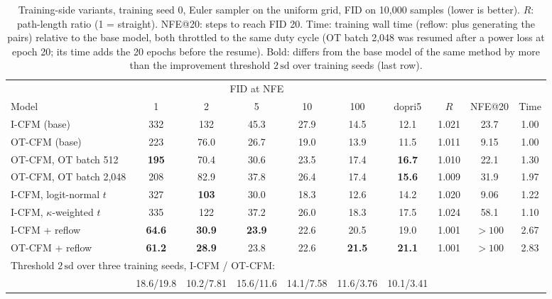 \begin{table}[t]
\centering
\caption{Training-side variants, training seed 0, Euler sampler on the uniform grid, FID on 10,000 samples (lower is better). $R$: path-length ratio (1 = straight). NFE@20: steps to reach FID 20. Time: training wall time (reflow: plus generating the pairs) relative to the base model, both throttled to the same duty cycle (OT batch 2,048 was resumed after a power loss at epoch 20; its time adds the 20 epochs before the resume). Bold: differs from the base model of the same method by more than the improvement threshold $2\,\mathrm{sd}$ over training seeds (last row).}
\label{tab:training}
\small
\setlength{\tabcolsep}{2.9pt}
\begin{tabular}{lccccccccc}
\toprule
 & \multicolumn{5}{c}{FID at NFE} & & & & \\
\cmidrule(lr){2-6}
Model & 1 & 2 & 5 & 10 & 100 & dopri5 & $R$ & NFE@20 & Time \\
\midrule
I-CFM (base) & 332 & 132 & 45.3 & 27.9 & 14.5 & 12.1 & 1.021 & 23.7 & 1.00 \\
OT-CFM (base) & 223 & 76.0 & 26.7 & 19.0 & 13.9 & 11.5 & 1.011 & 9.15 & 1.00 \\
OT-CFM, OT batch 512 & \textbf{195} & 70.4 & 30.6 & 23.5 & 17.4 & \textbf{16.7} & 1.010 & 22.1 & 1.30 \\
OT-CFM, OT batch 2,048 & 208 & 82.9 & 37.8 & 26.4 & 17.4 & \textbf{15.6} & 1.009 & 31.9 & 1.97 \\
I-CFM, logit-normal $t$ & 327 & \textbf{103} & 30.0 & 18.3 & 12.6 & 14.2 & 1.020 & 9.06 & 1.22 \\
I-CFM, $\kappa$-weighted $t$ & 335 & 122 & 37.2 & 26.0 & 18.3 & 17.5 & 1.024 & 58.1 & 1.10 \\
I-CFM + reflow & \textbf{64.6} & \textbf{30.9} & \textbf{23.9} & 22.6 & 20.5 & 19.0 & 1.001 & $>100$ & 2.67 \\
OT-CFM + reflow & \textbf{61.2} & \textbf{28.9} & 23.8 & 22.6 & \textbf{21.5} & \textbf{21.1} & 1.001 & $>100$ & 2.83 \\
\midrule
\multicolumn{10}{l}{Threshold $2\,\mathrm{sd}$ over three training seeds, I-CFM / OT-CFM:} \\
 & 18.6/19.8 & 10.2/7.81 & 15.6/11.6 & 14.1/7.58 & 11.6/3.76 & 10.1/3.41 & & & \\
\bottomrule
\end{tabular}
\end{table}
